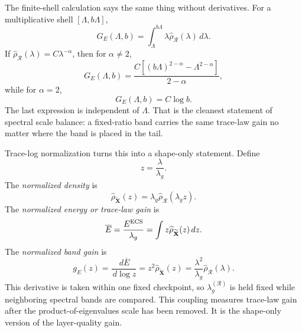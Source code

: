 \documentclass[10pt,twocolumn]{article}
\newcommand{\dd}{\,d}
\newcommand{\Xtilde}{\widetilde{\mathbf X}}
\newcommand{\Rell}{\mathcal R}
\newcommand{\rhohat}{\widehat\rho}
\newif\ifUseTildeECSNotation
\newcommand{\Ered}{\ifUseTildeECSNotation \widetilde E\else E^{\rm ECS}\fi}
\begin{document}
The finite-shell calculation says the same thing without derivatives. For a multiplicative shell $[\Lambda,b\Lambda]$,
\begin{equation}
G_E(\Lambda,b)=\int_\Lambda^{b\Lambda}\lambda\rhohat_{\Rell}(\lambda)\dd\lambda.
\label{eq:finite_shell}
\end{equation}
If $\rhohat_{\Rell}(\lambda)=C\lambda^{-\alpha}$, then for $\alpha\ne2$,
\begin{equation}
G_E(\Lambda,b)=
\frac{C\left[(b\Lambda)^{2-\alpha}-\Lambda^{2-\alpha}\right]}{2-\alpha},
\label{eq:finite_shell_ne2}
\end{equation}
while for $\alpha=2$,
\begin{equation}
G_E(\Lambda,b)=C\log b.
\label{eq:finite_shell_eq2}
\end{equation}
The last expression is independent of $\Lambda$. That is the cleanest statement of spectral scale balance: a fixed-ratio band carries the same trace-law gain no matter where the band is placed in the tail.

Trace-log normalization turns this into a shape-only statement. Define
\begin{equation}
z=\frac{\lambda}{\lambda_g}.
\label{eq:zdef}
\end{equation}
The \emph{normalized density} is
\begin{equation}
\rhohat_{\Xtilde}(z)
=\lambda_g\rhohat_{\Rell}(\lambda_gz).
\label{eq:rho_z}
\end{equation}
The \emph{normalized energy or trace-law gain} is
\begin{equation}
\overline E=\frac{\Ered}{\lambda_g}
=\int z\rhohat_{\Xtilde}(z)\dd z.
\label{eq:Ebar}
\end{equation}
The \emph{normalized band gain} is
\begin{equation}
g_E(z)=\frac{\dd\overline E}{\dd\log z}
=z^2\rhohat_{\Xtilde}(z)
=\frac{\lambda^2}{\lambda_g}\rhohat_{\Rell}(\lambda).
\label{eq:gE_correct}
\end{equation}
This derivative is taken within one fixed checkpoint, so $\lambda_g^{(\mathcal R)}$ is held fixed while neighboring spectral bands are compared. This coupling measures trace-law gain after the product-of-eigenvalues scale has been removed. It is the shape-only version of the layer-quality gain.
\end{document}

